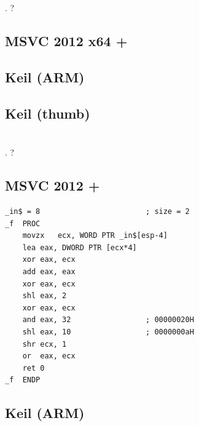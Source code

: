 \section{}

.
?

\subsection{MSVC 2012 x64 + \Ox}



\subsection{Keil (ARM)}



\subsection{Keil (thumb)}



\section{}

.
?

\subsection{MSVC 2012 + \Ox}

\begin{lstlisting}
_in$ = 8						; size = 2
_f	PROC
	movzx	ecx, WORD PTR _in$[esp-4]
	lea	eax, DWORD PTR [ecx*4]
	xor	eax, ecx
	add	eax, eax
	xor	eax, ecx
	shl	eax, 2
	xor	eax, ecx
	and	eax, 32					; 00000020H
	shl	eax, 10					; 0000000aH
	shr	ecx, 1
	or	eax, ecx
	ret	0
_f	ENDP
\end{lstlisting}

\subsection{Keil (ARM)}


